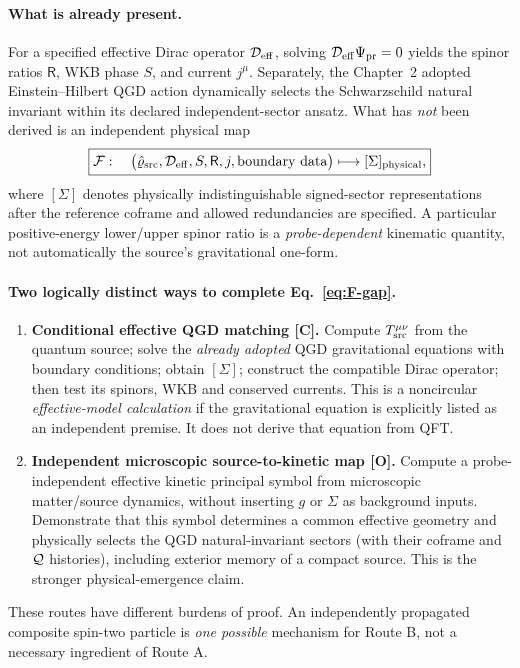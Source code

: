 \documentclass[11pt,a4paper]{article}
\begin{document}
\paragraph{What is already present.}
For a specified effective Dirac operator $\mathcal D_{\rm eff}$, solving $\mathcal D_{\rm eff}\Psi_{\rm pr}=0$ yields the spinor ratios $\mathsf R$, WKB phase $S$, and current $j^\mu$. Separately, the Chapter~2 adopted Einstein--Hilbert QGD action dynamically selects the Schwarzschild natural invariant within its declared independent-sector ansatz. What has \emph{not} been derived is an independent physical map
\begin{equation}\label{eq:F-gap}
 \boxed{\mathcal F:\quad\bigl(\hat\varrho_{\rm src},\mathcal D_{\rm eff},S,\mathsf R,j,\text{boundary data}\bigr)
 \longmapsto[\Sigma]_{\rm physical},}
\end{equation}
where $[\Sigma]$ denotes physically indistinguishable signed-sector representations after the reference coframe and allowed redundancies are specified. A particular positive-energy lower/upper spinor ratio is a \emph{probe-dependent} kinematic quantity, not automatically the source's gravitational one-form.

\paragraph{Two logically distinct ways to complete Eq.~\eqref{eq:F-gap}.}
\begin{enumerate}[label=\textbf{Route \Alph*.},leftmargin=14mm]
\item \textbf{Conditional effective QGD matching [C].} Compute $T^{\mu\nu}_{\rm src}$ from the quantum source; solve the \emph{already adopted} QGD gravitational equations with boundary conditions; obtain $[\Sigma]$; construct the compatible Dirac operator; then test its spinors, WKB and conserved currents. This is a noncircular \emph{effective-model calculation} if the gravitational equation is explicitly listed as an independent premise. It does not derive that equation from QFT.
\item \textbf{Independent microscopic source-to-kinetic map [O].} Compute a probe-independent effective kinetic principal symbol from microscopic matter/source dynamics, without inserting $g$ or $\Sigma$ as background inputs. Demonstrate that this symbol determines a common effective geometry and physically selects the QGD natural-invariant sectors (with their coframe and $\mathcal Q$ histories), including exterior memory of a compact source. This is the stronger physical-emergence claim.
\end{enumerate}
These routes have different burdens of proof. An independently propagated composite spin-two particle is \emph{one possible} mechanism for Route B, not a necessary ingredient of Route A.
\end{document}

